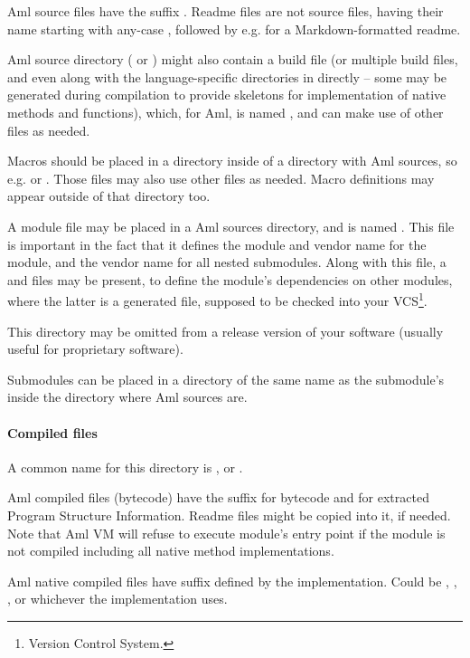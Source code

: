 Aml source files have the suffix . Readme files are not source files, having their name starting with any-case , followed by e.g.  for a Markdown-formatted readme. 

Aml source directory ( or ) might also contain a build file (or multiple build files, and even along with the language-specific directories in  directly -- some may be generated during compilation to provide skeletons for implementation of native methods and functions), which, for Aml, is named , and can make use of other files as needed. 

Macros should be placed in a  directory inside of a directory with Aml sources, so e.g.  or . Those files may also use other files as needed. Macro definitions may appear outside of that directory too. 

A module file may be placed in a Aml sources directory, and is named . This file is important in the fact that it defines the module and vendor name for the module, and the vendor name for all nested submodules. Along with this file, a  and  files may be present, to define the module's dependencies on other modules, where the latter is a generated file, supposed to be checked into your VCS\footnote{Version Control System.}.

This directory may be omitted from a release version of your software (usually useful for proprietary software). 

Submodules can be placed in a directory of the same name as the submodule's inside the directory where Aml sources are. 

\paragraph{Compiled files}
A common name for this directory is , or .

Aml compiled files (bytecode) have the suffix  for bytecode and  for extracted Program Structure Information. Readme files might be copied into it, if needed. Note that Aml VM will refuse to execute module's entry point if the module is not compiled including all native method implementations. 

Aml native compiled files have suffix defined by the implementation. Could be , , , or whichever the implementation uses. 

